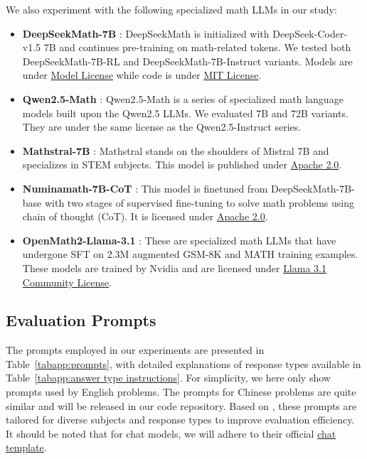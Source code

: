 We also experiment with the following specialized math LLMs in our study:
\begin{itemize}
    \item \textbf{DeepSeekMath-7B} \citep{deepseekmath2024shao}: DeepSeekMath is initialized with DeepSeek-Coder-v1.5 7B and continues pre-training on math-related tokens. We tested both DeepSeekMath-7B-RL and DeepSeekMath-7B-Instruct variants. Models are under \href{https://github.com/deepseek-ai/DeepSeek-Math/blob/main/LICENSE-MODEL}{Model License} while code is under \href{https://github.com/deepseek-ai/DeepSeek-Math/blob/main/LICENSE-CODE}{MIT License}.
    \item \textbf{Qwen2.5-Math} \citep{Qwen25Math2024Yang}: Qwen2.5-Math is a series of specialized math language models built upon the Qwen2.5 LLMs. We evaluated 7B and 72B variants. They are under the same license as the Qwen2.5-Instruct series.
    \item \textbf{Mathstral-7B} \citep{mathstral2023}: Mathstral stands on the shoulders of Mistral 7B and specializes in STEM subjects. This model is published under \href{https://www.apache.org/licenses/LICENSE-2.0}{Apache 2.0}.
    \item \textbf{Numinamath-7B-CoT} \citep{numinamath7b}: This model is finetuned from DeepSeekMath-7B-base with two stages of supervised fine-tuning to solve math problems using chain of thought (CoT). It is licensed under \href{https://www.apache.org/licenses/LICENSE-2.0}{Apache 2.0}.
    \item \textbf{OpenMath2-Llama-3.1} \citep{openmathinstruct2024toshniwal}:
    These are specialized math LLMs that have undergone SFT on 2.3M augmented GSM-8K and MATH training examples. These models are trained by Nvidia and are licensed under \href{https://github.com/meta-llama/llama-models/blob/main/models/llama3_1/LICENSE}{Llama 3.1 Community License}.
\end{itemize}





\subsection{Evaluation Prompts}\label{app: prompts}

The prompts employed in our experiments are presented in Table~\ref{tabapp:prompts}, with detailed explanations of response types available in Table~\ref{tabapp:answer type instructions}. 
For simplicity, we here only show prompts used by English problems. 
The prompts for Chinese problems are quite similar and will be released in our code repository. 
Based on \citet{OlympiadBench2024He, OlympicArena2024huang}, these prompts are tailored for diverse subjects and response types to improve evaluation efficiency.
It should be noted that for chat models, we will adhere to their official \href{https://huggingface.co/docs/transformers/main/en/chat_templating}{chat template}.



